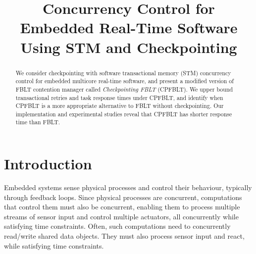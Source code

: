 \documentclass[conference]{IEEEtran}
\begin{document}
\title{Concurrency Control for Embedded Real-Time Software Using STM and Checkpointing}

\begin{comment}
\author{\IEEEauthorblockN{Mohammed Elshambakey}
\IEEEauthorblockA{Electrical and Computer Engineering School, VT\\
Blacksburg, VA, USA, 24060\\
Email: shambake@vt.edu}
\and
\IEEEauthorblockN{Binoy Ravindran}
\IEEEauthorblockA{Electrical and Computer Engineering School, VT\\
Blacksburg, VA, USA, 24060\\
Email: binoy@vt.edu}}
\end{comment}

\maketitle

\begin{abstract}
We consider checkpointing with software transactional memory (STM) concurrency control for embedded multicore real-time software, and present a modified version of FBLT contention manager called \textit{Checkpointing FBLT} (CPFBLT). We upper bound transactional retries and task response times under CPFBLT, and identify when CPFBLT is a more appropriate alternative to FBLT without checkpointing. Our implementation and experimental studies reveal that CPFBLT has shorter response time than FBLT.
\end{abstract}

\section{Introduction}
\label{sec:intro}

Embedded systems sense physical processes and control their behaviour, typically through feedback loops. Since physical processes are concurrent, computations that control them must also be concurrent, enabling them to process multiple streams of sensor input and control multiple actuators, all concurrently while satisfying time constraints. Often, such computations need to concurrently read/write shared data objects. They must also process sensor input and react, while satisfying time constraints. 
\end{document}
